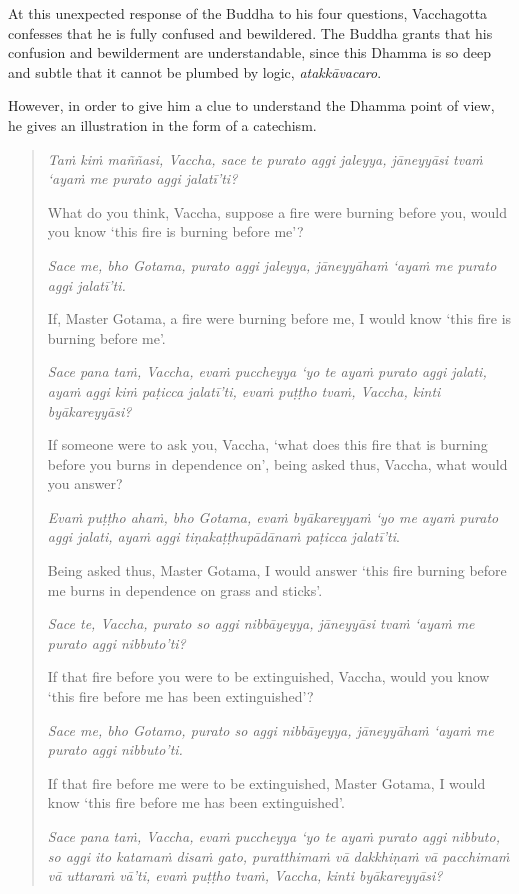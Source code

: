 At this unexpected response of the Buddha to his four questions, Vacchagotta confesses that he is fully confused and bewildered. The Buddha grants that his confusion and bewilderment are understandable, since this Dhamma is so deep and subtle that it cannot be plumbed by logic, \emph{atakkāvacaro}.

However, in order to give him a clue to understand the Dhamma point of view, he gives an illustration in the form of a catechism.

\begin{quote}
\emph{Taṁ kiṁ maññasi, Vaccha, sace te purato aggi jaleyya, jāneyyāsi tvaṁ `ayaṁ me purato aggi jalatī'ti?}

What do you think, Vaccha, suppose a fire were burning before you, would you know `this fire is burning before me'?

\emph{Sace me, bho Gotama, purato aggi jaleyya, jāneyyāhaṁ `ayaṁ me purato aggi jalatī'ti.}

If, Master Gotama, a fire were burning before me, I would know `this fire is burning before me'.

\emph{Sace pana taṁ, Vaccha, evaṁ puccheyya `yo te ayaṁ purato aggi jalati, ayaṁ aggi kiṁ paṭicca jalatī'ti, evaṁ puṭṭho tvaṁ, Vaccha, kinti byākareyyāsi?}

If someone were to ask you, Vaccha, `what does this fire that is burning before you burns in dependence on', being asked thus, Vaccha, what would you answer?

\emph{Evaṁ puṭṭho ahaṁ, bho Gotama, evaṁ byākareyyaṁ `yo me ayaṁ purato aggi jalati, ayaṁ aggi tiṇakaṭṭhupādānaṁ paṭicca jalatī'ti}.

Being asked thus, Master Gotama, I would answer `this fire burning before me burns in dependence on grass and sticks'.

\emph{Sace te, Vaccha, purato so aggi nibbāyeyya, jāneyyāsi tvaṁ `ayaṁ me purato aggi nibbuto'ti?}

If that fire before you were to be extinguished, Vaccha, would you know `this fire before me has been extinguished'?

\emph{Sace me, bho Gotamo, purato so aggi nibbāyeyya, jāneyyāhaṁ `ayaṁ me purato aggi nibbuto'ti.}

If that fire before me were to be extinguished, Master Gotama, I would know `this fire before me has been extinguished'.

\emph{Sace pana taṁ, Vaccha, evaṁ puccheyya `yo te ayaṁ purato aggi nibbuto, so aggi ito katamaṁ disaṁ gato, puratthimaṁ vā dakkhiṇaṁ vā pacchimaṁ vā uttaraṁ vā'ti, evaṁ puṭṭho tvaṁ, Vaccha, kinti byākareyyāsi?}


\end{quote}

